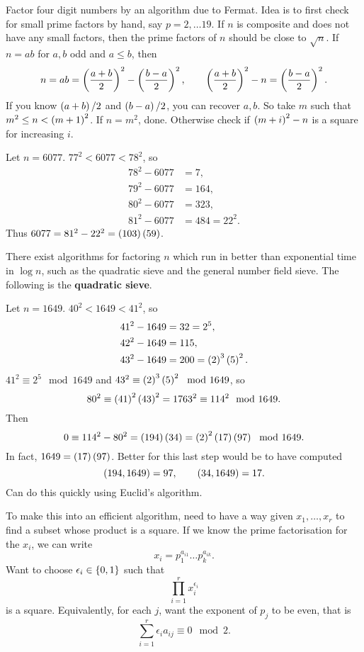 Factor four digit numbers by an algorithm due to Fermat. Idea is to first check for small prime factors by hand, say $ p = 2, \dots 19 $. If $ n $ is composite and does not have any small factors, then the prime factors of $ n $ should be close to $ \sqrt{n} $. If $ n = ab $ for $ a, b $ odd and $ a \le b $, then
$$ n = ab = \left( \dfrac{a + b}{2} \right)^2 - \left( \dfrac{b - a}{2} \right)^2, \qquad \left( \dfrac{a + b}{2} \right)^2 - n = \left( \dfrac{b - a}{2} \right)^2. $$
If you know $ \left( a + b \right) / 2 $ and $ \left( b - a \right) / 2 $, you can recover $ a, b $. So take $ m $ such that $ m^2 \le n < \left( m + 1 \right)^2 $. If $ n = m^2 $, done. Otherwise check if $ \left( m + i \right)^2 - n $ is a square for increasing $ i $.

\begin{example2}
Let $ n  = 6077 $. $ 77^2 < 6077 < 78^2 $, so
\begin{align*}
78^2 - 6077 & = 7, \\
79^2 - 6077 & = 164, \\
80^2 - 6077 & = 323, \\
81^2 - 6077 & = 484 = 22^2.
\end{align*}
Thus $ 6077 = 81^2 - 22^2 = \left( 103 \right)\left( 59 \right) $.
\end{example2}

There exist algorithms for factoring $ n $ which run in better than exponential time in $ \log n $, such as the quadratic sieve and the general number field sieve. The following is the \textbf{quadratic sieve}.

\begin{example2}
Let $ n = 1649 $. $ 40^2 < 1649 < 41^2 $, so
\begin{align*}
41^2 - 1649 & = 32 = 2^5, \\
42^2 - 1649 & = 115, \\
43^2 - 1649 & = 200 = \left( 2 \right)^3\left( 5 \right)^2.
\end{align*}
$ 41^2 \equiv 2^5 \mod 1649 $ and $ 43^2 \equiv \left( 2 \right)^3\left( 5 \right)^2 \mod 1649 $, so
$$ 80^2 \equiv \left( 41 \right)^2\left( 43 \right)^2 = 1763^2 \equiv 114^2 \mod 1649. $$
Then
$$ 0 \equiv 114^2 - 80^2 = \left( 194 \right)\left( 34 \right) = \left( 2 \right)^2\left( 17 \right)\left( 97 \right) \mod 1649. $$
In fact, $ 1649 = \left( 17 \right)\left( 97 \right) $. Better for this last step would be to have computed
$$ \left( 194, 1649 \right) = 97, \qquad \left( 34, 1649 \right) = 17. $$
Can do this quickly using Euclid's algorithm.
\end{example2}

To make this into an efficient algorithm, need to have a way given $ x_1, \dots, x_r $ to find a subset whose product is a square. If we know the prime factorisation for the $ x_i $, we can write
$$ x_i = p_1^{a_{i1}} \dots p_k^{a_{ik}}. $$
Want to choose $ \epsilon_i \in \left\{ 0, 1 \right\} $ such that
$$ \prod_{i = 1}^r x_i^{\epsilon_i} $$
is a square. Equivalently, for each $ j $, want the exponent of $ p_j $ to be even, that is
$$ \sum_{i = 1}^r \epsilon_ia_{ij} \equiv 0 \mod 2. $$

